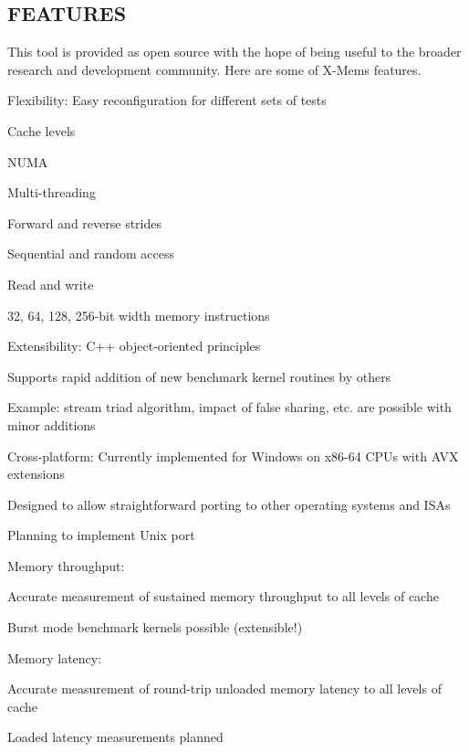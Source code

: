 \subsection*{F\+E\+A\+T\+U\+R\+E\+S }

This tool is provided as open source with the hope of being useful to the broader research and development community. Here are some of X-\/\+Mem\textquotesingle{}s features.

Flexibility\+: Easy reconfiguration for different sets of tests
\begin{DoxyItemize}
\item Cache levels
\item N\+U\+M\+A
\item Multi-\/threading
\item Forward and reverse strides
\item Sequential and random access
\item Read and write
\item 32, 64, 128, 256-\/bit width memory instructions
\end{DoxyItemize}

Extensibility\+: C++ object-\/oriented principles
\begin{DoxyItemize}
\item Supports rapid addition of new benchmark kernel routines by others
\item Example\+: stream triad algorithm, impact of false sharing, etc. are possible with minor additions
\end{DoxyItemize}

Cross-\/platform\+: Currently implemented for Windows on x86-\/64 C\+P\+Us with A\+V\+X extensions
\begin{DoxyItemize}
\item Designed to allow straightforward porting to other operating systems and I\+S\+As
\item Planning to implement Unix port
\end{DoxyItemize}

Memory throughput\+:
\begin{DoxyItemize}
\item Accurate measurement of sustained memory throughput to all levels of cache
\item Burst mode benchmark kernels possible (extensible!)
\end{DoxyItemize}

Memory latency\+:
\begin{DoxyItemize}
\item Accurate measurement of round-\/trip unloaded memory latency to all levels of cache
\item Loaded latency measurements planned
\end{DoxyItemize}


